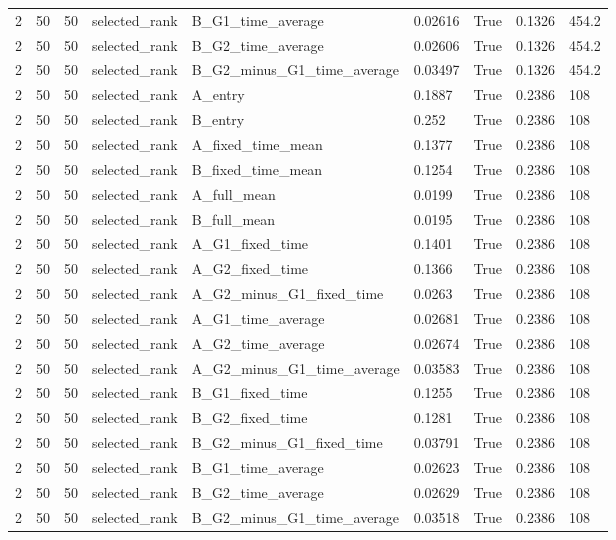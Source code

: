 \begin{longtable}{lllllllll}
2 & 50 & 50 & selected\_rank & B\_G1\_time\_average & 0.02616 & True & 0.1326 & 454.2 \\
2 & 50 & 50 & selected\_rank & B\_G2\_time\_average & 0.02606 & True & 0.1326 & 454.2 \\
2 & 50 & 50 & selected\_rank & B\_G2\_minus\_G1\_time\_average & 0.03497 & True & 0.1326 & 454.2 \\
2 & 50 & 50 & selected\_rank & A\_entry & 0.1887 & True & 0.2386 & 108 \\
2 & 50 & 50 & selected\_rank & B\_entry & 0.252 & True & 0.2386 & 108 \\
2 & 50 & 50 & selected\_rank & A\_fixed\_time\_mean & 0.1377 & True & 0.2386 & 108 \\
2 & 50 & 50 & selected\_rank & B\_fixed\_time\_mean & 0.1254 & True & 0.2386 & 108 \\
2 & 50 & 50 & selected\_rank & A\_full\_mean & 0.0199 & True & 0.2386 & 108 \\
2 & 50 & 50 & selected\_rank & B\_full\_mean & 0.0195 & True & 0.2386 & 108 \\
2 & 50 & 50 & selected\_rank & A\_G1\_fixed\_time & 0.1401 & True & 0.2386 & 108 \\
2 & 50 & 50 & selected\_rank & A\_G2\_fixed\_time & 0.1366 & True & 0.2386 & 108 \\
2 & 50 & 50 & selected\_rank & A\_G2\_minus\_G1\_fixed\_time & 0.0263 & True & 0.2386 & 108 \\
2 & 50 & 50 & selected\_rank & A\_G1\_time\_average & 0.02681 & True & 0.2386 & 108 \\
2 & 50 & 50 & selected\_rank & A\_G2\_time\_average & 0.02674 & True & 0.2386 & 108 \\
2 & 50 & 50 & selected\_rank & A\_G2\_minus\_G1\_time\_average & 0.03583 & True & 0.2386 & 108 \\
2 & 50 & 50 & selected\_rank & B\_G1\_fixed\_time & 0.1255 & True & 0.2386 & 108 \\
2 & 50 & 50 & selected\_rank & B\_G2\_fixed\_time & 0.1281 & True & 0.2386 & 108 \\
2 & 50 & 50 & selected\_rank & B\_G2\_minus\_G1\_fixed\_time & 0.03791 & True & 0.2386 & 108 \\
2 & 50 & 50 & selected\_rank & B\_G1\_time\_average & 0.02623 & True & 0.2386 & 108 \\
2 & 50 & 50 & selected\_rank & B\_G2\_time\_average & 0.02629 & True & 0.2386 & 108 \\
2 & 50 & 50 & selected\_rank & B\_G2\_minus\_G1\_time\_average & 0.03518 & True & 0.2386 & 108 \\

\end{longtable}
